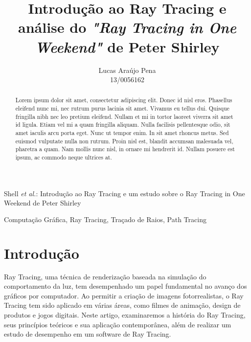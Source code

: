 \documentclass[journal]{IEEEtran}
\begin{document}
\title{Introdução ao Ray Tracing e análise do \emph{"Ray Tracing in One Weekend"} de Peter Shirley}

\author{ Lucas Araújo Pena \\ 
         13/0056162 }

%
{Shell \MakeLowercase{\textit{et al.}}: Introdução ao Ray Tracing e um estudo sobre o Ray Tracing in One Weekend de Peter Shirley}

\maketitle

\begin{abstract}
Lorem ipsum dolor sit amet, consectetur adipiscing elit. Donec id nisl eros. 
Phasellus eleifend nunc mi, nec rutrum purus lacinia sit amet. Vivamus eu 
tellus dui. Quisque fringilla nibh nec leo pretium eleifend. Nullam et mi in 
tortor laoreet viverra sit amet id ligula. Etiam vel mi a quam fringilla 
aliquam. Nulla facilisis pellentesque odio, sit amet iaculis arcu porta 
eget. Nunc ut tempor enim. In sit amet rhoncus metus. Sed euismod vulputate 
nulla non rutrum. Proin nisl est, blandit accumsan malesuada vel, pharetra a 
quam. Nam mollis nunc nisl, in ornare mi hendrerit id. Nullam posuere est 
ipsum, ac commodo neque ultrices at.
\end{abstract}


\begin{IEEEkeywords}
Computação Gráfica, Ray Tracing, Traçado de Raios, Path Tracing
\end{IEEEkeywords}

\section{Introdução}

 Ray Tracing, uma técnica de renderização baseada na simulação do 
comportamento da luz, tem desempenhado um papel fundamental no avanço
dos gráficos por computador. Ao permitir a criação de imagens fotorrealistas, 
o Ray Tracing tem sido aplicado em várias áreas, como filmes de animação,
design de produtos e jogos digitais. Neste artigo, examinaremos a história 
do Ray Tracing, seus princípios teóricos e sua aplicação contemporânea, além 
de realizar um estudo de desempenho em um software de Ray Tracing. 
\end{document}
